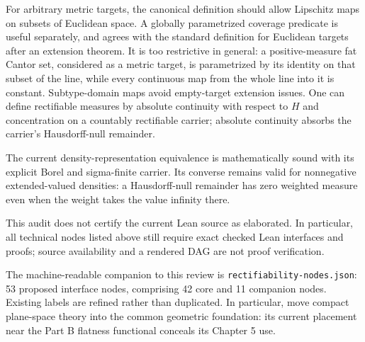 For arbitrary metric targets, the canonical definition should allow Lipschitz
maps on subsets of Euclidean space. A globally parametrized coverage predicate
is useful separately, and agrees with the standard definition for Euclidean
targets after an extension theorem. It is too restrictive in general: a
positive-measure fat Cantor set, considered as a metric target, is parametrized
by its identity on that subset of the line, while every continuous map from
the whole line into it is constant. Subtype-domain maps avoid empty-target
extension issues. One can define rectifiable measures by absolute continuity
with respect to $H$ and concentration on a countably rectifiable carrier;
absolute continuity absorbs the carrier's Hausdorff-null remainder.

The current density-representation equivalence is mathematically sound with
its explicit Borel and sigma-finite carrier. Its converse remains valid for
nonnegative extended-valued densities: a Hausdorff-null remainder has zero
weighted measure even when the weight takes the value infinity there.

This audit does not certify the current Lean source as elaborated. In particular,
all technical nodes listed above still require exact checked Lean interfaces
and proofs; source availability and a rendered DAG are not proof verification.

The machine-readable companion to this review is \texttt{rectifiability-nodes.json}:
53 proposed interface nodes, comprising 42 core and 11 companion nodes.
Existing labels are refined rather than duplicated. In particular, move
compact plane-space theory into the common geometric foundation: its current
placement near the Part B flatness functional conceals its Chapter 5 use.
